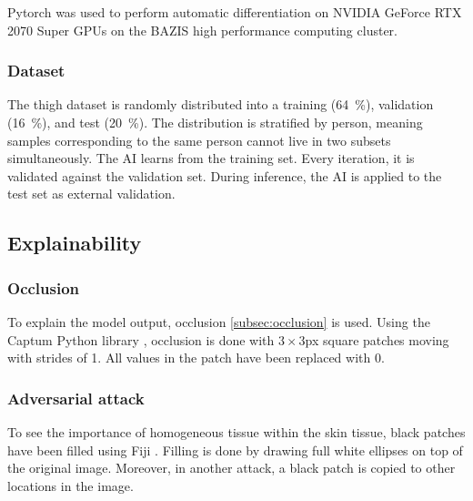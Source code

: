 Pytorch \cite{Paszke2019} was used to perform automatic differentiation on NVIDIA GeForce RTX 2070 Super GPUs on the BAZIS high performance computing cluster.

\subsubsection{Dataset}\label{subsec:skin_dataset}
The thigh dataset is randomly distributed into a training (\qty{64}{\percent}), validation (\qty{16}{\percent}), and test (\qty{20}{\percent}).
The distribution is stratified by person, meaning samples corresponding to the same person cannot live in two subsets simultaneously.
The AI learns from the training set.
Every iteration, it is validated against the validation set.
During inference, the AI is applied to the test set as external validation.


\subsection{Explainability}

\subsubsection{Occlusion}
To explain the model output, occlusion \cref{subsec:occlusion} is used.
Using the Captum Python library \cite{Kokhlikyan2020}, occlusion is done with $3\times 3$\unit{px} square patches moving with strides of 1.
All values in the patch have been replaced with 0.

\subsubsection{Adversarial attack}
To see the importance of homogeneous tissue within the skin tissue, black patches have been filled using Fiji \cite{Schindelin2012}.
Filling is done by drawing full white ellipses on top of the original image.
Moreover, in another attack, a black patch is copied to other locations in the image.
